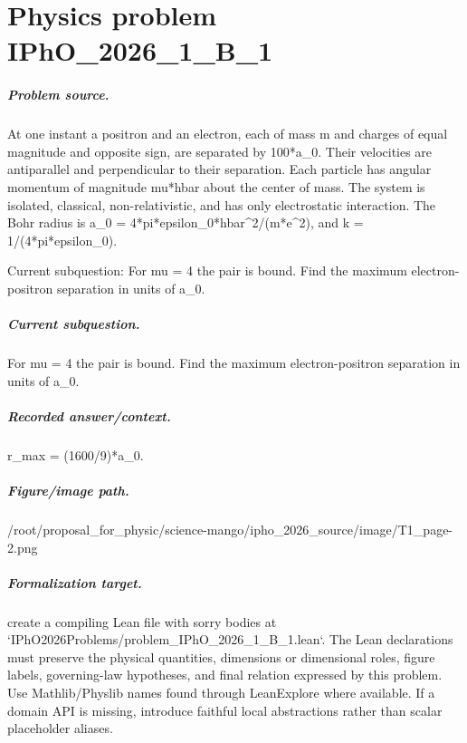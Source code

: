 
\chapter{Physics problem IPhO\_2026\_1\_B\_1}
\label{ch:IPhO2026Problems_problem_IPhO_2026_1_B_1}

\paragraph{Problem source.}
At one instant a positron and an electron, each of mass m and charges of equal
magnitude and opposite sign, are separated by 100*a\_0.  Their velocities are
antiparallel and perpendicular to their separation.  Each particle has angular
momentum of magnitude mu*hbar about the center of mass.  The system is isolated,
classical, non-relativistic, and has only electrostatic interaction.  The Bohr
radius is a\_0 = 4*pi*epsilon\_0*hbar\textasciicircum{}2/(m*e\textasciicircum{}2), and k = 1/(4*pi*epsilon\_0).

Current subquestion:
For mu = 4 the pair is bound. Find the maximum electron-positron separation in units of a\_0.

\paragraph{Current subquestion.}
For mu = 4 the pair is bound. Find the maximum electron-positron separation in units of a\_0.

\paragraph{Recorded answer/context.}
r\_max = (1600/9)*a\_0.

\paragraph{Figure/image path.}
/root/proposal\_for\_physic/science-mango/ipho\_2026\_source/image/T1\_page-2.png

\paragraph{Formalization target.}
create a compiling Lean file with sorry bodies at `IPhO2026Problems/problem\_IPhO\_2026\_1\_B\_1.lean`.
The Lean declarations must preserve the physical quantities, dimensions or dimensional roles, figure labels, governing-law hypotheses, and final relation expressed by this problem.
Use Mathlib/Physlib names found through LeanExplore where available. If a domain API is missing, introduce faithful local abstractions rather than scalar placeholder aliases.


